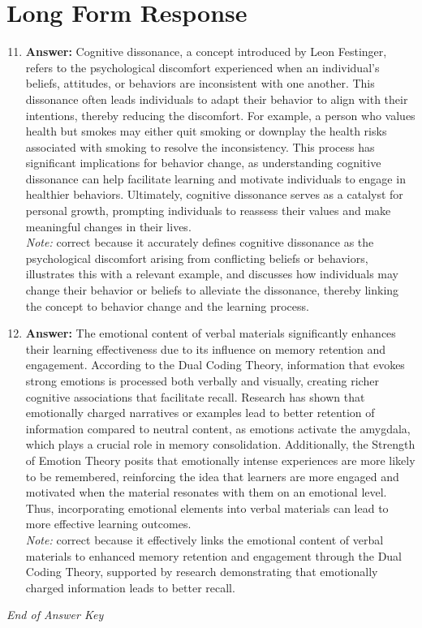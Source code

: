 \documentclass[12pt]{article}
\begin{document}
\section*{Long Form Response}
\begin{enumerate}[label=\arabic*.]
\setcounter{enumi}{10}
\item \textbf{Answer:} Cognitive dissonance, a concept introduced by Leon Festinger, refers to the psychological discomfort experienced when an individual's beliefs, attitudes, or behaviors are inconsistent with one another. This dissonance often leads individuals to adapt their behavior to align with their intentions, thereby reducing the discomfort. For example, a person who values health but smokes may either quit smoking or downplay the health risks associated with smoking to resolve the inconsistency. This process has significant implications for behavior change, as understanding cognitive dissonance can help facilitate learning and motivate individuals to engage in healthier behaviors. Ultimately, cognitive dissonance serves as a catalyst for personal growth, prompting individuals to reassess their values and make meaningful changes in their lives.
\\ \textit{Note:} correct because it accurately defines cognitive dissonance as the psychological discomfort arising from conflicting beliefs or behaviors, illustrates this with a relevant example, and discusses how individuals may change their behavior or beliefs to alleviate the dissonance, thereby linking the concept to behavior change and the learning process.
\item \textbf{Answer:} The emotional content of verbal materials significantly enhances their learning effectiveness due to its influence on memory retention and engagement. According to the Dual Coding Theory, information that evokes strong emotions is processed both verbally and visually, creating richer cognitive associations that facilitate recall. Research has shown that emotionally charged narratives or examples lead to better retention of information compared to neutral content, as emotions activate the amygdala, which plays a crucial role in memory consolidation. Additionally, the Strength of Emotion Theory posits that emotionally intense experiences are more likely to be remembered, reinforcing the idea that learners are more engaged and motivated when the material resonates with them on an emotional level. Thus, incorporating emotional elements into verbal materials can lead to more effective learning outcomes.
\\ \textit{Note:} correct because it effectively links the emotional content of verbal materials to enhanced memory retention and engagement through the Dual Coding Theory, supported by research demonstrating that emotionally charged information leads to better recall.
\end{enumerate}

\vfill
\noindent\textit{End of Answer Key}
\end{document}
